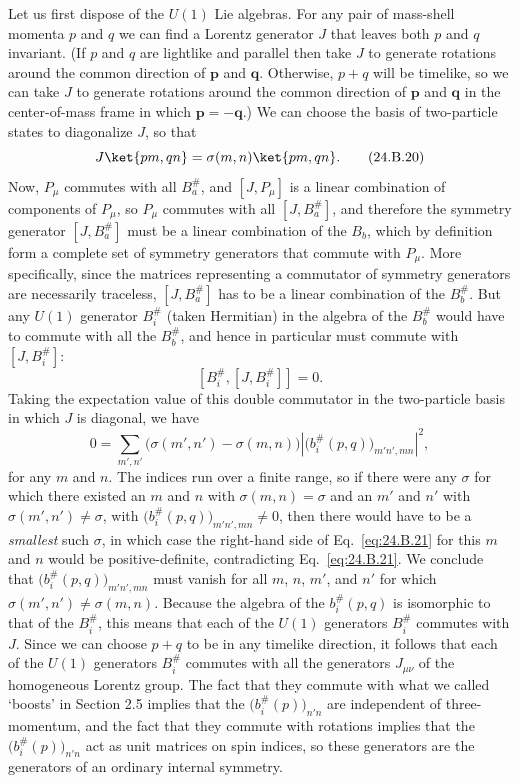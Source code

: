 Let us first dispose of the $U(1)$ Lie algebras. For any pair of mass-shell
momenta $p$ and $q$ we can find a Lorentz generator $J$ that leaves both $p$
and $q$ invariant. (If $p$ and $q$ are lightlike and parallel then take $J$ to
generate rotations around the common direction of $\mathbf{p}$ and
$\mathbf{q}$. Otherwise, $p+q$ will be timelike, so we can take $J$ to
generate rotations around the common direction of $\mathbf{p}$ and
$\mathbf{q}$ in the center-of-mass frame in which $\mathbf{p}=-\mathbf{q}$.)
We can choose the basis of two-particle states to diagonalize $J$, so that
\begin{equation}
 J\ket{p m,q n}=\sigma(m,n)\ket{p m,q n}.
\tag{24.B.20}\label{eq:24.B.20}
\end{equation}
Now, $P_\mu$ commutes with all $B_a^\#$, and $[J,P_\mu]$ is a linear
combination of components of $P_\mu$, so $P_\mu$ commutes with all
$[J,B_a^\#]$, and therefore the symmetry generator $[J,B_a^\#]$
must be a linear combination of the $B_b$, which by definition form a
complete set of symmetry generators that commute with $P_\mu$. More
specifically, since the matrices representing a commutator of symmetry
generators are necessarily traceless, $[J,B_a^\#]$ has to be a linear
combination of the $B_b^\#$. But any $U(1)$ generator $B_i^\#$ (taken
Hermitian) in the algebra of the $B_b^\#$ would have to commute with all
the $B_b^\#$, and hence in particular must commute with $[J,B_i^\#]$:
\[
 [B_i^\#,[J,B_i^\#]]=0.
\]
Taking the expectation value of this double commutator in the two-particle
basis in which $J$ is diagonal, we have
\begin{equation}
 0=\sum_{m',n'}
 \bigl(\sigma(m',n')-\sigma(m,n)\bigr)
 \left|\bigl(b_i^\#(p,q)\bigr)_{m'n',mn}\right|^2,
\tag{24.B.21}\label{eq:24.B.21}
\end{equation}
for any $m$ and $n$. The indices run over a finite range, so if there were any
$\sigma$ for which there existed an $m$ and $n$ with $\sigma(m,n)=\sigma$ and
an $m'$ and $n'$ with $\sigma(m',n')\ne\sigma$, with
$\bigl(b_i^\#(p,q)\bigr)_{m'n',mn}\ne0$, then there would have to be a
\emph{smallest} such $\sigma$, in which case the right-hand side of
Eq.~\eqref{eq:24.B.21} for this $m$ and $n$ would be positive-definite,
contradicting Eq.~\eqref{eq:24.B.21}. We conclude that
$\bigl(b_i^\#(p,q)\bigr)_{m'n',mn}$ must vanish for all $m$, $n$, $m'$, and
$n'$ for which $\sigma(m',n')\ne\sigma(m,n)$. Because the algebra of the
$b_i^\#(p,q)$ is isomorphic to that of the $B_i^\#$, this means that each of
the $U(1)$ generators $B_i^\#$ commutes with $J$. Since we can choose $p+q$ to
be in any timelike direction, it follows that each of the $U(1)$ generators
$B_i^\#$ commutes with all the generators $J_{\mu\nu}$ of the homogeneous
Lorentz group. The fact that they commute with what we called `boosts' in
Section 2.5 implies that the $\bigl(b_i^\#(p)\bigr)_{n'n}$ are independent of
three-momentum, and the fact that they commute with rotations implies that the
$\bigl(b_i^\#(p)\bigr)_{n'n}$ act as unit matrices on spin indices, so these
generators are the generators of an ordinary internal symmetry.

